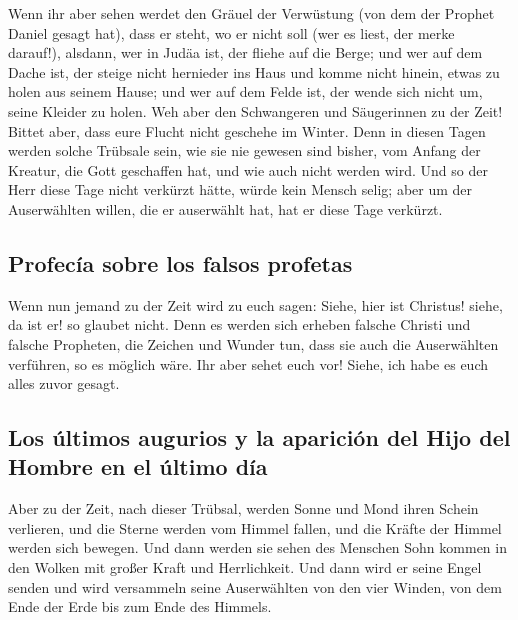  Wenn ihr aber sehen werdet den Gräuel der Verwüstung
(von dem der Prophet Daniel gesagt hat), dass er steht, wo er nicht soll
(wer es liest, der merke darauf!), alsdann, wer in Judäa ist, der fliehe
auf die Berge;  und wer auf dem Dache ist, der steige
nicht hernieder ins Haus und komme nicht hinein, etwas zu holen aus
seinem Hause;  und wer auf dem Felde ist, der wende sich
nicht um, seine Kleider zu holen.  Weh aber den
Schwangeren und Säugerinnen zu der Zeit!  Bittet aber,
dass eure Flucht nicht geschehe im Winter.  Denn in
diesen Tagen werden solche Trübsale sein, wie sie nie gewesen sind
bisher, vom Anfang der Kreatur, die Gott geschaffen hat, und wie auch
nicht werden wird.  Und so der Herr diese Tage nicht
verkürzt hätte, würde kein Mensch selig; aber um der Auserwählten
willen, die er auserwählt hat, hat er diese Tage verkürzt.

\hypertarget{profecuxeda-sobre-los-falsos-profetas}{%
\subsection{Profecía sobre los falsos
profetas}\label{profecuxeda-sobre-los-falsos-profetas}}

 Wenn nun jemand zu der Zeit wird zu euch sagen: Siehe,
hier ist Christus! siehe, da ist er! so glaubet nicht. 
Denn es werden sich erheben falsche Christi und falsche Propheten, die
Zeichen und Wunder tun, dass sie auch die Auserwählten verführen, so es
möglich wäre.  Ihr aber sehet euch vor! Siehe, ich habe
es euch alles zuvor gesagt.

\hypertarget{los-uxfaltimos-augurios-y-la-apariciuxf3n-del-hijo-del-hombre-en-el-uxfaltimo-duxeda}{%
\subsection{Los últimos augurios y la aparición del Hijo del Hombre en
el último
día}\label{los-uxfaltimos-augurios-y-la-apariciuxf3n-del-hijo-del-hombre-en-el-uxfaltimo-duxeda}}

 Aber zu der Zeit, nach dieser Trübsal, werden Sonne und
Mond ihren Schein verlieren,  und die Sterne werden vom
Himmel fallen, und die Kräfte der Himmel werden sich bewegen.
 Und dann werden sie sehen des Menschen Sohn kommen in
den Wolken mit großer Kraft und Herrlichkeit.  Und dann
wird er seine Engel senden und wird versammeln seine Auserwählten von
den vier Winden, von dem Ende der Erde bis zum Ende des Himmels.

